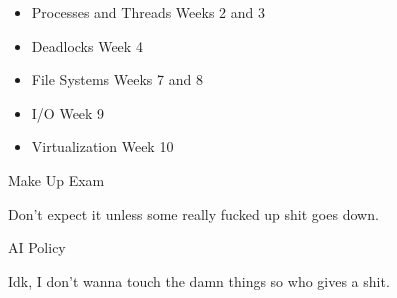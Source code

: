\documentclass{report}
\begin{document}
\begin{description}
\begin{mdframed}
\begin{itemize}
                \item Processes and Threads Weeks 2 and 3
                \item Deadlocks Week 4
                \item File Systems Weeks 7 and 8
                \item I/O Week 9
                \item Virtualization Week 10
            \end{itemize}
        \end{mdframed}
    \item Make Up Exam
        \begin{mdframed}
            Don't expect it unless some really
            fucked up shit goes down.
        \end{mdframed}
    \item AI Policy
        \begin{mdframed}
            Idk, I don't wanna touch the damn things
            so who gives a shit.
        \end{mdframed}
\end{description}
\end{document}
